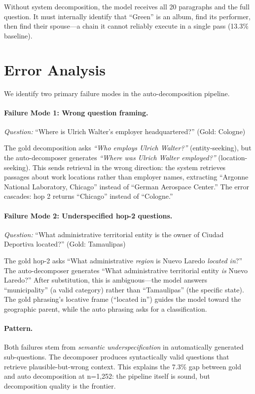 \documentclass[11pt]{article}
\begin{document}
Without system decomposition, the model receives all 20 paragraphs and the full question. It must internally identify that ``Green'' is an album, find its performer, then find their spouse---a chain it cannot reliably execute in a single pass (13.3\% baseline).

\section{Error Analysis}
\label{app:errors}

We identify two primary failure modes in the auto-decomposition pipeline.

\paragraph{Failure Mode 1: Wrong question framing.}

\emph{Question:} ``Where is Ulrich Walter's employer headquartered?'' (Gold: Cologne)

The gold decomposition asks \emph{``Who employs Ulrich Walter?''} (entity-seeking), but the auto-decomposer generates \emph{``Where was Ulrich Walter employed?''} (location-seeking). This sends retrieval in the wrong direction: the system retrieves passages about work locations rather than employer names, extracting ``Argonne National Laboratory, Chicago'' instead of ``German Aerospace Center.'' The error cascades: hop 2 returns ``Chicago'' instead of ``Cologne.''

\paragraph{Failure Mode 2: Underspecified hop-2 questions.}

\emph{Question:} ``What administrative territorial entity is the owner of Ciudad Deportiva located?'' (Gold: Tamaulipas)

The gold hop-2 asks ``What administrative \emph{region} is Nuevo Laredo \emph{located in}?'' The auto-decomposer generates ``What administrative territorial entity \emph{is} Nuevo Laredo?'' After substitution, this is ambiguous---the model answers ``municipality'' (a valid category) rather than ``Tamaulipas'' (the specific state). The gold phrasing's locative frame (``located in'') guides the model toward the geographic parent, while the auto phrasing asks for a classification.

\paragraph{Pattern.} Both failures stem from \emph{semantic underspecification} in automatically generated sub-questions. The decomposer produces syntactically valid questions that retrieve plausible-but-wrong context. This explains the 7.3\% gap between gold and auto decomposition at n=1,252: the pipeline itself is sound, but decomposition quality is the frontier.
\end{document}
